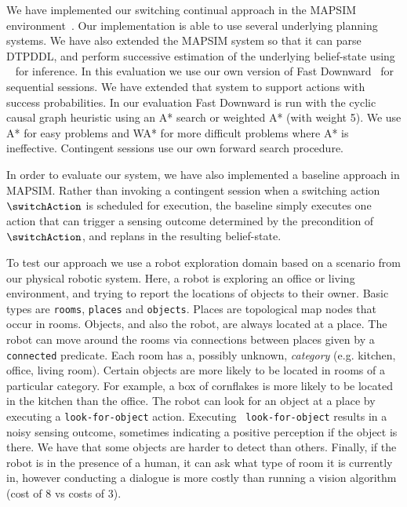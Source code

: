 
We have implemented our switching continual approach in the MAPSIM
environment~\cite{brenner:nebel:jaamas09}. Our implementation is able
to use several underlying planning systems. We have also extended the
MAPSIM system so that it can parse DTPDDL, and perform successive
estimation of the underlying belief-state using
~\cite{king:2009} for inference.  In this evaluation
we use our own version of Fast Downward~\cite{fast-downward} for
sequential sessions. We have extended that system to support actions
with success probabilities. In our evaluation Fast Downward is run
with the cyclic causal graph heuristic using an A* search or weighted
A* (with weight 5). We use A* for easy problems and WA* for more
difficult problems where A* is ineffective. Contingent sessions use
our own forward search procedure.



In order to evaluate our system, we have also implemented a baseline
approach in MAPSIM. Rather than invoking a contingent session when a
switching action $\switchAction$ is scheduled for execution, the
baseline simply executes one action that can trigger a sensing outcome
determined by the precondition of $\switchAction$, and replans in the
resulting belief-state.






To test our approach we use a robot exploration domain based on a
scenario from our physical robotic system. Here, a robot is exploring
an office or living environment, and trying to report the locations of
objects to their owner. Basic types are {\tt rooms}, {\tt places} and
{\tt objects}. Places are topological map nodes that occur in rooms.
Objects, and also the robot, are always located at a place. The robot
can move around the rooms via connections between places given by a
{\tt connected} predicate. Each room has a, possibly unknown, {\em
  category} (e.g. kitchen, office, living room). Certain objects are
more likely to be located in rooms of a particular category.  For
example, a box of cornflakes is more likely to be located in the
kitchen than the office. The robot can look for an object at a place
by executing a {\tt look-for-object} action. Executing {\tt
  look-for-object} results in a noisy sensing outcome, sometimes
indicating a positive perception if the object is there. We have that
some objects are harder to detect than others. Finally, if the robot
is in the presence of a human, it can ask what type of room it is
currently in, however conducting a dialogue is more costly than
running a vision algorithm (cost of 8 vs costs of 3).

